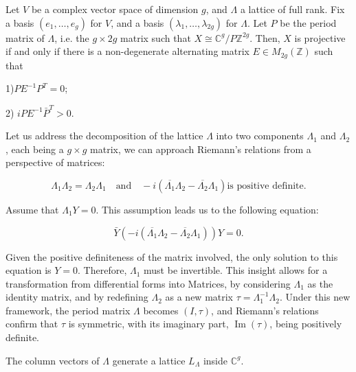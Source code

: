 \begin{theorem}\label{riemann}
    Let $V$ be a complex vector space of dimension $g$, and $\Lambda$ a lattice of full rank. Fix a basis $\left(e_{1}, \ldots, e_{g}\right)$ for $V$, and a basis $\left(\lambda_{1}, \ldots, \lambda_{2 g}\right)$ for $\Lambda$. Let $P$ be the period matrix of $\Lambda$, i.e. the $g \times 2 g$ matrix such that $X \cong \mathbb{C}^{g} / P \mathbb{Z}^{2 g}$. Then, $X$ is projective if and only if there is a non-degenerate alternating matrix $E \in M_{2 g}(\mathbb{Z})$ such that

1)$P E^{-1} P^{T}=0$;

2) $i P E^{-1} \bar{P}^{T}>0$.

\end{theorem}
\begin{remark}
Let us address the decomposition of the lattice \( \Lambda \) into two components \( \Lambda_{1} \) and \( \Lambda_{2} \), each being a \( g \times g \) matrix, we can approach Riemann's relations from a perspective of matrices:

\[
\Lambda_{1} \Lambda_{2} = \Lambda_{2} \Lambda_{1} \quad \text{and} \quad -i(\overline{\Lambda_{1}} \Lambda_{2} - \overline{\Lambda_{2}} \Lambda_{1}) \text{is positive definite}.
\]


Assume that \( \Lambda_{1} Y = 0 \). This assumption leads us to the following equation:

\[
\bar{Y}(-i(\overline{\Lambda_{1}} \Lambda_{2} - \overline{\Lambda_{2}} \Lambda_{1})) Y = 0.
\]

Given the positive definiteness of the matrix involved, the only solution to this equation is \( Y = 0 \). Therefore, \( \Lambda_{1} \) must be invertible. This insight allows for a transformation from differential forms into Matrices, by considering \( \Lambda_{1} \) as the identity matrix, and by redefining \( \Lambda_{2} \) as a new matrix \( \tau = \Lambda_{1}^{-1} \Lambda_{2} \). Under this new framework, the period matrix \( \Lambda \) becomes \( (I, \tau) \), and Riemann's relations confirm that \( \tau \) is symmetric, with its imaginary part, \( \operatorname{Im}(\tau) \), being positively definite.

\end{remark}

\begin{corollary}
    The column vectors of $\Lambda$ generate a lattice $L_{\Lambda}$ inside $\mathbb{C}^{g}$.

\end{corollary}

